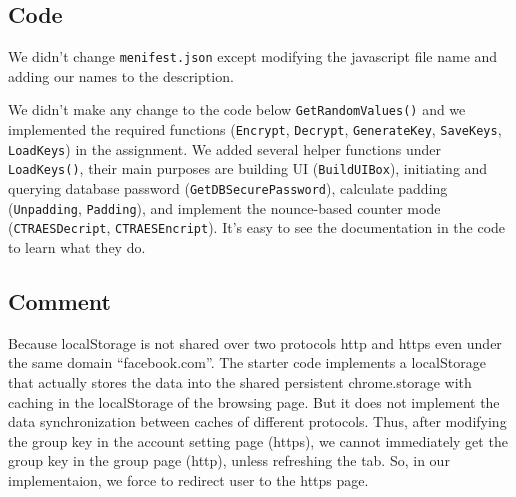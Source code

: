 \subsection{Code}

We didn't change \texttt{menifest.json} except modifying the javascript file name and adding our names to the description.

We didn't make any change to the code below \texttt{GetRandomValues()} and we implemented the required functions (\texttt{Encrypt}, \texttt{Decrypt}, \texttt{GenerateKey}, \texttt{SaveKeys}, \texttt{LoadKeys}) in the assignment. We added several helper functions under \texttt{LoadKeys()}, their main purposes are building UI (\texttt{BuildUIBox}), initiating and querying database password (\texttt{GetDBSecurePassword}), calculate padding (\texttt{Unpadding}, \texttt{Padding}), and implement the nounce-based counter mode (\texttt{CTRAESDecript}, \texttt{CTRAESEncript}). It's easy to see the documentation in the code to learn what they do.

\subsection{Comment}

Because localStorage is not shared over two protocols http and https even under the same domain ``facebook.com''. 
The starter code implements a localStorage that actually stores the data into the shared persistent chrome.storage with caching in the localStorage of the browsing page. But it does not implement the data synchronization between caches of different protocols. Thus, after modifying the group key in the account setting page (https), we cannot immediately get the group key in the group page (http), unless refreshing the tab. So, in our implementaion, we force to redirect user to the https page. 



